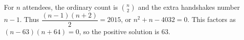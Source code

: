For $n$ attendees, the ordinary count is $\binom n2$ and the extra handshakes number $n-1$. Thus $\dfrac{(n-1)(n+2)}{2}=2015$, or $n^2+n-4032=0$. This factors as $(n-63)(n+64)=0$, so the positive solution is $\boxed{63}$.
